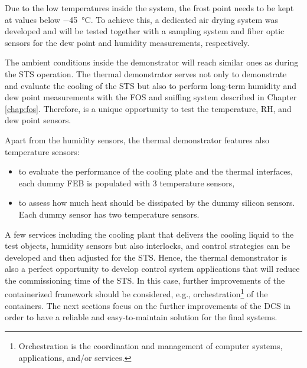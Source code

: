  Due to the low temperatures inside the system, the frost point needs to be kept at values below \SI{-45}{\celsius}. To achieve this, a dedicated air drying system was developed and will be tested together with a sampling system and fiber optic sensors for the dew point and humidity measurements, respectively. 
 
 The ambient conditions inside the demonstrator will reach similar ones as during the \gls{STS} operation. The thermal demonstrator serves not only to demonstrate and evaluate the cooling of the \gls{STS} but also to perform long-term humidity and dew point measurements with the \gls{FOS} and sniffing system described in Chapter \ref{chap:fos}. Therefore,  is a unique opportunity to test the temperature, RH, and dew point sensors.
 
 Apart from the humidity sensors, the thermal demonstrator features also temperature sensors:
 \begin{itemize}
     \item to evaluate the performance of the cooling plate and the thermal interfaces, each dummy \gls{FEB} is populated with 3 temperature sensors,
     \item to assess how much heat should be dissipated by the dummy silicon sensors. Each dummy sensor has two temperature sensors.
 \end{itemize}



A few services including the cooling plant that delivers the cooling liquid to the test objects, humidity sensors but also interlocks, and control strategies can be developed and then adjusted for the \gls{STS}. Hence, the thermal demonstrator is also a perfect opportunity to develop control system applications that will reduce the commissioning time of the \gls{STS}. In this case, further improvements of the containerized framework should be considered, e.g., orchestration\footnote{Orchestration is the coordination and management of computer systems, applications, and/or services.} of the containers. The next sections focus on the further improvements of the \gls{DCS} in order to have a reliable and easy-to-maintain solution for the final systems. 